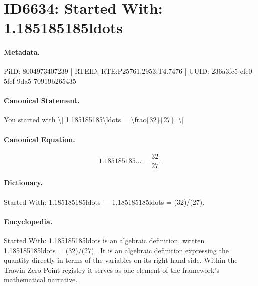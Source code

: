 \section*{ID6634: Started With: 1.185185185ldots}
\paragraph{Metadata.}
PiID: 8004973407239 | RTEID: RTE:P25761.2953:T4.7476 | UUID: 236a3fc5-efe0-5fcf-9da5-70919b265435

\paragraph{Canonical Statement.}
You started with \textbackslash{}[ 1.185185185\textbackslash{}ldots = \textbackslash{}frac\{32\}\{27\}. \textbackslash{}]

\paragraph{Canonical Equation.}
\[
1.185185185\ldots = \frac{32}{27}.
\]

\paragraph{Dictionary.}
Started With: 1.185185185ldots — 1.185185185ldots = (32)/(27).

\paragraph{Encyclopedia.}
Started With: 1.185185185ldots is an algebraic definition, written 1.185185185ldots = (32)/(27).. It is an algebraic definition expressing the quantity directly in terms of the variables on its right-hand side. Within the Trawin Zero Point registry it serves as one element of the framework's mathematical narrative.
